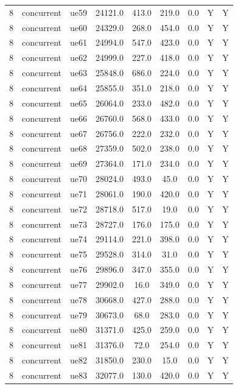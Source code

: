 \begin{table}[ht]
\begin{tabular}{|c|c|c|c|c|c|c|c|c|}
8 & concurrent & ue59 & 24121.0 & 413.0 & 219.0 & 0.0 & Y & Y \\
8 & concurrent & ue60 & 24329.0 & 268.0 & 454.0 & 0.0 & Y & Y \\
8 & concurrent & ue61 & 24994.0 & 547.0 & 423.0 & 0.0 & Y & Y \\
8 & concurrent & ue62 & 24999.0 & 227.0 & 418.0 & 0.0 & Y & Y \\
8 & concurrent & ue63 & 25848.0 & 686.0 & 224.0 & 0.0 & Y & Y \\
8 & concurrent & ue64 & 25855.0 & 351.0 & 218.0 & 0.0 & Y & Y \\
8 & concurrent & ue65 & 26064.0 & 233.0 & 482.0 & 0.0 & Y & Y \\
8 & concurrent & ue66 & 26760.0 & 568.0 & 433.0 & 0.0 & Y & Y \\
8 & concurrent & ue67 & 26756.0 & 222.0 & 232.0 & 0.0 & Y & Y \\
8 & concurrent & ue68 & 27359.0 & 502.0 & 238.0 & 0.0 & Y & Y \\
8 & concurrent & ue69 & 27364.0 & 171.0 & 234.0 & 0.0 & Y & Y \\
8 & concurrent & ue70 & 28024.0 & 493.0 & 45.0 & 0.0 & Y & Y \\
8 & concurrent & ue71 & 28061.0 & 190.0 & 420.0 & 0.0 & Y & Y \\
8 & concurrent & ue72 & 28718.0 & 517.0 & 19.0 & 0.0 & Y & Y \\
8 & concurrent & ue73 & 28727.0 & 176.0 & 175.0 & 0.0 & Y & Y \\
8 & concurrent & ue74 & 29114.0 & 221.0 & 398.0 & 0.0 & Y & Y \\
8 & concurrent & ue75 & 29528.0 & 314.0 & 31.0 & 0.0 & Y & Y \\
8 & concurrent & ue76 & 29896.0 & 347.0 & 355.0 & 0.0 & Y & Y \\
8 & concurrent & ue77 & 29902.0 & 16.0 & 349.0 & 0.0 & Y & Y \\
8 & concurrent & ue78 & 30668.0 & 427.0 & 288.0 & 0.0 & Y & Y \\
8 & concurrent & ue79 & 30673.0 & 68.0 & 283.0 & 0.0 & Y & Y \\
8 & concurrent & ue80 & 31371.0 & 425.0 & 259.0 & 0.0 & Y & Y \\
8 & concurrent & ue81 & 31376.0 & 72.0 & 254.0 & 0.0 & Y & Y \\
8 & concurrent & ue82 & 31850.0 & 230.0 & 15.0 & 0.0 & Y & Y \\
8 & concurrent & ue83 & 32077.0 & 130.0 & 420.0 & 0.0 & Y & Y \\

\end{tabular}
\end{table}
